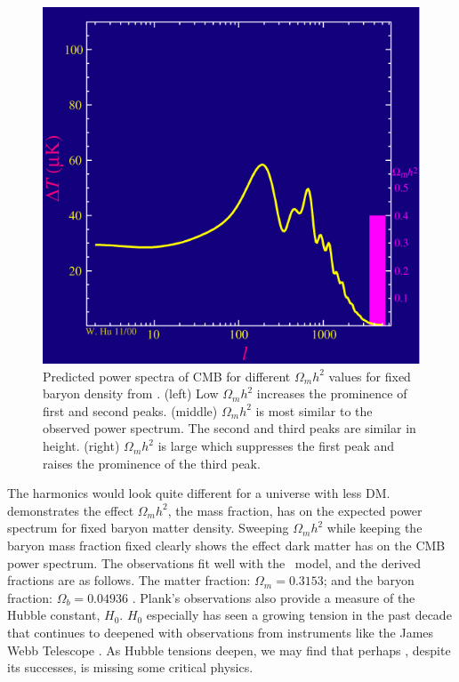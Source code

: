 \begin{figure}[ht]
{        \includegraphics[scale=0.285]{figures/LCDM_multipole/frame_16_delay-0.2s.png}
        \caption{Predicted power spectra of CMB for different $\Omega_m h^2$ values for fixed baryon density from \cite{waynehu:dm_anim}. (left) Low $\Omega_m h^2$ increases the prominence of first and second peaks. (middle) $\Omega_m h^2$ is most similar to the observed power spectrum. The second and third peaks are similar in height. (right) $\Omega_mh^2$ is large which suppresses the first peak and raises the prominence of the third peak.}
        \label{fig:CMB_vibratemodes}
    }
\end{figure}

The harmonics would look quite different for a universe with less DM.
 demonstrates the effect $\Omega_m h^2$, the mass fraction, has on the expected power spectrum for fixed baryon matter density. \cite{waynehu:dm_anim}
Sweeping  $\Omega_m h^2$ while keeping the baryon mass fraction fixed clearly shows the effect dark matter has on the CMB power spectrum.
The observations fit well with the \lcdm~model, and the derived fractions are as follows.
The matter fraction: $\Omega_m = 0.3153$; and the baryon fraction: $\Omega_b = 0.04936$ \cite{Plank:CMB}.
Plank's observations also provide a measure of the Hubble constant, $H_0$.
$H_0$ especially has seen a growing tension in the past decade that continues to deepened with observations from instruments like the James Webb Telescope \cite{JWST:hubble_tension,Freedman:hubble_tension}.
As Hubble tensions deepen, we may find that perhaps \lcdm, despite its successes, is missing some critical physics.

